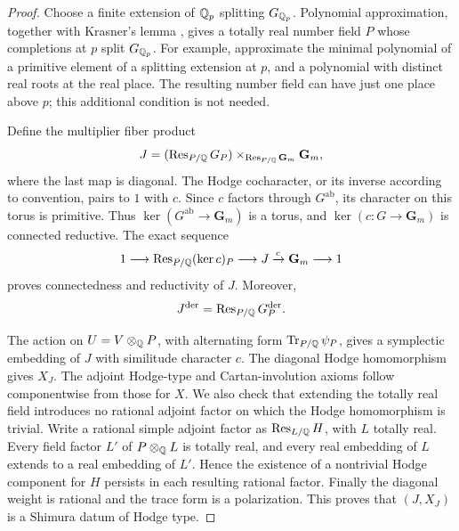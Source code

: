 \begin{proof}
Choose a finite extension of $\mathbb Q_p$ splitting $G_{\mathbb Q_p}$.  Polynomial
approximation, together with Krasner's lemma
\cite[Propositions~7.60--7.61 and Corollary~7.62]{MilneANT}, gives a
totally real number field $P$ whose completions at $p$ split $G_{\mathbb Q_p}$.  For
example, approximate the minimal polynomial of a primitive element
of a splitting extension at $p$, and a polynomial with distinct real
roots at the real place.  The resulting number field can have just
one place above $p$; this additional condition is not needed.

Define the multiplier fiber product
\begin{equation}
 J=(\operatorname{Res}_{P/\mathbb Q}G_P)
       \mathbin{\times}_{\operatorname{Res}_{P/\mathbb Q}\mathbf G_m}\mathbf G_m,
 \label{eq:equal-multiplier-group}
\end{equation}
where the last map is diagonal.  The Hodge cocharacter, or its
inverse according to convention, pairs to $1$ with $c$.  Since $c$
factors through $G^{\mathrm{ab}}$, its character on this torus is
primitive.  Thus $\ker(G^{\mathrm{ab}}\to\mathbf G_m)$ is a torus,
and $\ker(c:G\to\mathbf G_m)$ is connected reductive.  The exact
sequence
\[
 1\longrightarrow\operatorname{Res}_{P/\mathbb Q}(\ker c)_P
 \longrightarrow J\xrightarrow{c}\mathbf G_m\longrightarrow1
\]
proves connectedness and reductivity of $J$.  Moreover,
\begin{equation}
 J^{\mathrm{der}}=\operatorname{Res}_{P/\mathbb Q}G_P^{\mathrm{der}}.
 \label{eq:auxiliary-derived}
\end{equation}

The action on $U=V\otimes_\mathbb Q P$, with alternating form
$\operatorname{Tr}_{P/\mathbb Q}\psi_P$, gives a symplectic embedding of $J$ with
similitude character $c$.  The diagonal Hodge homomorphism gives
$X_J$.  The adjoint Hodge-type and Cartan-involution axioms follow
componentwise from those for $X$.  We also check that extending the
totally real field introduces no rational adjoint factor on which
the Hodge homomorphism is trivial.  Write a rational simple adjoint
factor as $\operatorname{Res}_{L/\mathbb Q}H$, with $L$ totally real.  Every field factor
$L'$ of $P\otimes_\mathbb Q L$ is totally real, and every real embedding of
$L$ extends to a real embedding of $L'$.  Hence the existence of a
nontrivial Hodge component for $H$ persists in each resulting
rational factor.  Finally the diagonal weight is rational and the
trace form is a polarization.  This proves that $(J,X_J)$ is a
Shimura datum of Hodge type.


\end{proof}
